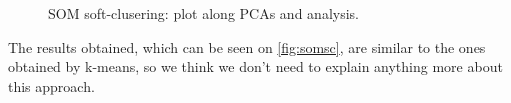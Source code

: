 \begin{figure}[H]
    \centering
    \caption{SOM soft-clusering: plot along PCAs and analysis.}
    \label{fig:somsc}
\end{figure}

The results obtained, which can be seen on \autoref{fig:somsc}, are similar to the ones obtained by k-means, so we think we don't need to explain anything more about this approach.